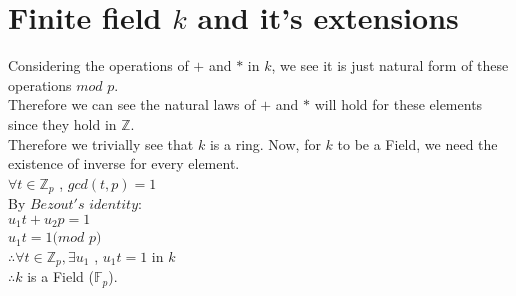 \documentclass{article}
\begin{document}
\section{Finite field $k$ and it's extensions}
Considering the operations of $+$ and $*$ in $k$, we see it is just natural form of these operations $mod$ $p$.
\\ Therefore we can see the natural laws of $+$ and $*$ will hold for these elements since they hold in $\mathbb{Z}$. 
\\ Therefore we trivially see that $k$ is a ring. Now, for $k$ to be a Field, we need the existence of inverse for every element.
\\ $\forall t \in \mathbb{Z}_p$ , $gcd(t,p) = 1$
\\By $Bezout's$ $identity$:
\\ $u_1t + u_2p = 1$
\\ $u_1t = 1(mod$ $p)$
\\ $\therefore \forall t \in \mathbb{Z}_p, \exists u_1$ , $u_1t = 1$ in $k$
\\ $\therefore k$ is a Field ($\mathbb{F}_p$).
\end{document}
